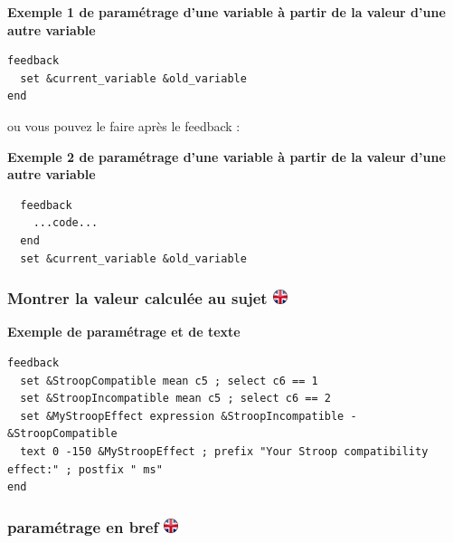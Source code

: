 \documentclass[
]{book}
\begin{document}
\textbf{Exemple 1 de paramétrage d'une variable à partir de la valeur
d'une autre variable}

\begin{verbatim}
feedback
  set &current_variable &old_variable
end
\end{verbatim}

ou vous pouvez le faire après le feedback :

\textbf{Exemple 2 de paramétrage d'une variable à partir de la valeur
d'une autre variable}

\begin{verbatim}
  feedback
    ...code...
  end
  set &current_variable &old_variable
\end{verbatim}

\hypertarget{montrer-la-valeur-calculuxe9e-au-sujet}{%
\subsubsection[Montrer la valeur calculée au sujet
]{\texorpdfstring{Montrer la valeur calculée au sujet
\href{https://www.psytoolkit.org/doc3.1.0/feedback.html\#_show_calculated_values_to_participant}{\protect\includegraphics{img/ukflag.png}}}{Montrer la valeur calculée au sujet }}\label{montrer-la-valeur-calculuxe9e-au-sujet}}

\textbf{Exemple de paramétrage et de texte}

\begin{verbatim}
feedback
  set &StroopCompatible mean c5 ; select c6 == 1
  set &StroopIncompatible mean c5 ; select c6 == 2
  set &MyStroopEffect expression &StroopIncompatible - &StroopCompatible
  text 0 -150 &MyStroopEffect ; prefix "Your Stroop compatibility effect:" ; postfix " ms"
end
\end{verbatim}

\hypertarget{paramuxe9trage-en-bref}{%
\subsubsection[paramétrage en bref ]{\texorpdfstring{paramétrage en bref
\href{https://www.psytoolkit.org/doc3.1.0/feedback.html\#_set_in_summary}{\protect\includegraphics{img/ukflag.png}}}{paramétrage en bref }}\label{paramuxe9trage-en-bref}}
\end{document}

